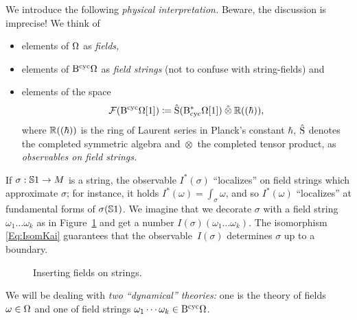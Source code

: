 \documentclass[\MainFolder/Text.tex]{subfiles}
\begin{document}
We introduce the following \emph{physical interpretation.} Beware, the discussion is imprecise!
We think of
\begin{itemize}
\item elements of $\Omega$ as \emph{fields,}
\item elements of $\mathrm{B}^{\mathrm{cyc}} \Omega$ as \emph{field strings} (not to confuse with string-fields) and
\item elements of the space
\[ \Fun(\BCyc \DR[1]) \coloneqq \hat{\Sym}(\DBCyc\DR[1])\COtimes \R((\hbar)), \]
where $\mathbb{R}((\hbar))$ is the ring of Laurent series in Planck's constant $\hbar$, $\hat{\mathrm{S}}$ denotes the completed symmetric algebra and $\hat{\otimes}$ the completed tensor product, as \emph{observables on field strings.}
\end{itemize}
If $\sigma:\mathbb{S}{1}\rightarrow M$ is a string, the observable $I^*(\sigma)$ ``localizes'' on field strings which approximate $\sigma$; for instance, it holds $I^*(\omega) = \int_{\sigma} \omega$, and so $I^*(\omega)$ ``localizes'' at fundamental forms of $\sigma(\mathbb{S}{1})$. We imagine that we decorate $\sigma$ with a field string $\omega_1 \dotsc \omega_k$ as in Figure~\ref{Fig:GeomStr} and get a number $I(\sigma)(\omega_1\dotsc\omega_k)$. The isomorphism \eqref{Eq:IsomKai} guarantees that the observable~$I(\sigma)$ determines $\sigma$ up to a boundary.
\begin{figure}[t]
 \centering
 \def\rad{2}
 \def\len{.4}
 \def\smalllen{.1}
 \def\num{6} 
 \caption{Inserting fields on strings.}
 \label{Fig:GeomStr}
\end{figure}
We will be dealing with \emph{two ``dynamical'' theories:} one is the theory of fields $\omega\in \Omega$ and one of field strings $\omega_1 \dotsb \omega_k \in \mathrm{B}^{\mathrm{cyc}} \Omega$.
\end{document}
